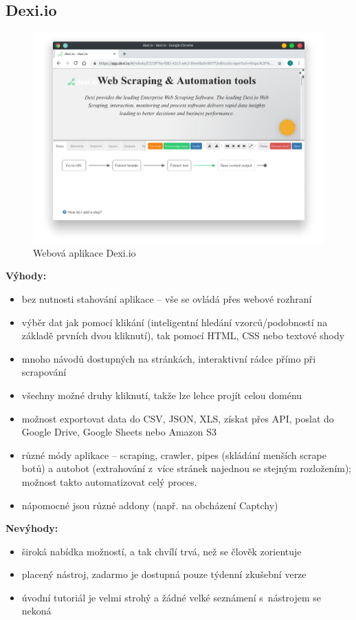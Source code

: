 \documentclass[thesis=B,czech]{FITthesis}[2012/06/26]
\begin{document}
\subsection{Dexi.io}
\begin{figure}[h]
	\includegraphics[width=\linewidth]{images/Dexiio.png}
	\caption{Webová aplikace Dexi.io\cite[snímek pořídil autor]{dexio}}
	\label{fig:dexi.io}
\end{figure}
\textbf{Výhody:}
\begin{itemize}
	\item bez nutnosti stahování aplikace -- vše se ovládá přes webové rozhraní
	\item výběr dat jak pomocí klikání (inteligentní hledání vzorců/podobností na základě prvních dvou kliknutí), tak pomocí HTML, CSS nebo textové shody
	\item mnoho návodů dostupných na stránkách, interaktivní rádce přímo při scrapování
	\item všechny možné druhy kliknutí, takže lze lehce projít celou doménu
	\item možnost exportovat data do CSV, JSON, XLS, získat přes API, poslat do Google Drive, Google Sheets nebo Amazon S3
	\item různé módy aplikace -- scraping, crawler, pipes (skládání menších scrape botů) a autobot (extrahování z~více stránek najednou se stejným rozložením); možnost takto automatizovat celý proces.
	\item nápomocné jsou různé addony (např. na obcházení Captchy)
\end{itemize}
\textbf{Nevýhody:}
\begin{itemize}
	\item široká nabídka možností, a tak chvílí trvá, než se člověk zorientuje
	\item placený nástroj, zadarmo je dostupná pouze týdenní zkušební verze
	\item úvodní tutoriál je velmi strohý a žádné velké seznámení s~nástrojem se nekoná
\end{itemize}
\end{document}
